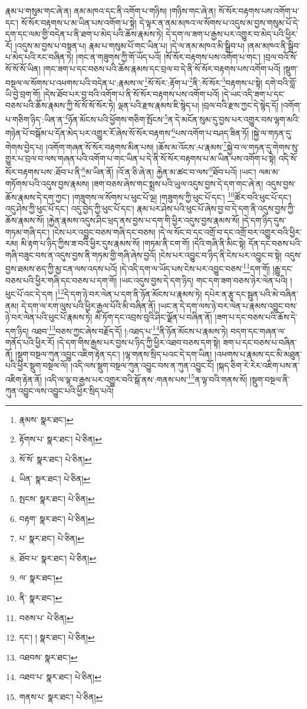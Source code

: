 རྣམ་པ་གསུམ་གང་ཞེ་ན། ནམ་མཁའ་དང་ནི་འགོག་པ་གཉིས། །གཉིས་གང་ཞེ་ན། སོ་སོར་བརྟགས་པས་འགོག་པ་དང་། སོ་སོར་བརྟགས་པ་མ་ཡིན་པས་འགོག་པ་སྟེ། དེ་ལྟར་ན་ནམ་མཁའ་ལ་སོགས་པ་འདུས་མ་བྱས་གསུམ་པོ་དེ་དག་དང་ལམ་གྱི་བདེན་པ་ནི་ཐག་པ་མེད་པའི་ཆོས་རྣམས་ཏེ། དེ་དག་ལ་ཟག་པ་རྒྱས་པར་འགྱུར་བ་མེད་པའི་ཕྱིར་རོ། །འདུས་མ་བྱས་པ་བསྟན་པ། རྣམ་པ་གསུམ་པོ་གང་ཡིན་པ། །དེ་ལ་ནམ་མཁའ་མི་སྒྲིབ་པ། །ནམ་མཁའ་ནི་སྒྲིབ་པ་མེད་པའི་རང་བཞིན་ཏེ། །གང་ན་གཟུགས་ཀྱི་གོ་ཡོད་པའོ། །སོ་སོར་བརྟགས་པས་འགོག་པ་གང་། །བྲལ་བའོ་སོ་སོ་སོ་སོ་ཡིན། །གང་ཟག་པ་དང་བཅས་པའི་ཆོས་རྣམས་དང་བྲལ་བ་དེ་ནི་སོ་སོར་བརྟགས་པས་འགོག་པའོ། །སྡུག་བསྔལ་ལ་སོགས་པ་འཕགས་པའི་བདེན་པ་:རྣམས་ལ་\footnote{རྣམས་  སྣར་ཐང་། }སོ་སོར་:རྟོག་པ་\footnote{རྟོགས་པ་  སྣར་ཐང་།  པེ་ཅིན། }ནི་:སོ་སོར་\footnote{སོ་སོ་  སྣར་ཐང་།  པེ་ཅིན། }བརྟགས་པ་སྟེ། དགེ་བའི་བློ་ཡི་བྱེ་བྲག་གོ། །དེས་ཐོབ་པར་བྱ་བའི་འགོག་པ་ནི་སོ་སོར་བརྟགས་པས་འགོག་པའོ། །དེ་ཡང་འདི་ཟག་པ་དང་བཅས་པའི་ཆོས་རྣམས་ཀྱི་སོ་སོ་སོ་སོར་ཏེ། ལྡན་པའི་རྫས་རྣམས་ཇི་སྙེད་པ། །བྲལ་བའི་རྫས་ཀྱང་དེ་སྙེད་དོ། །འགོག་པ་གཅིག་ཉིད་:ཡིན་ན་\footnote{ཡིན་  སྣར་ཐང་།  པེ་ཅིན། }ཉོན་མོངས་པའི་ཕྱོགས་གཅིག་སྤོངས་\footnote{སྤངས་  སྣར་ཐང་།  པེ་ཅིན། }ན་དེ་མངོན་སུམ་དུ་བྱས་པར་འགྱུར་བས་ལྷག་མའི་གཉེན་པོ་བསྒོམ་པ་དོན་མེད་པར་འགྱུར་རོ་ཞེས་སོ་སོར་བརྟགས་\footnote{བརྟག་  སྣར་ཐང་།  པེ་ཅིན། }པས་འགོག་པ་བཤད་ཟིན་ཏོ། །སྐྱེ་ལ་གཏན་དུ་གེགས་བྱེད་པ། །འགོག་གཞན་སོ་སོར་བརྟགས་མིན་པས། །ཆོས་མ་འོངས་:པ་རྣམས་\footnote{པ་  སྣར་ཐང་།  པེ་ཅིན། }སྐྱེ་བ་ལ་གཏན་དུ་གེགས་སུ་གྱུར་པ་བྲལ་བ་ལས་གཞན་པའི་འགོག་པ་གང་ཡིན་པ་དེ་ནི་སོ་སོར་བརྟགས་པ་མ་ཡིན་པས་འགོག་པ་སྟེ། འདི་སོ་སོར་བརྟགས་པས་:ཐོབ་པ་ནི་\footnote{ཐོབ་པ་  སྣར་ཐང་།  པེ་ཅིན། }མ་ཡིན་ནོ། །འོ་ན་ཅི་ཞེ་ན། རྐྱེན་མ་ཚང་བ་ལས་\footnote{ལ་  སྣར་ཐང་། }ཐོབ་པའོ། །ཡང་། ལམ་མ་གཏོགས་པའི་འདུས་བྱས་རྣམས། །ཟག་བཅས་ཞེས་གང་སྨྲས་པའི་ཡུལ་འདུས་བྱས་དེ་དག་གང་ཞེ་ན། འདུས་བྱས་ཆོས་རྣམས་དེ་དག་ཀྱང་། །གཟུགས་ལ་སོགས་པ་ཕུང་པོ་ལྔ། །གཟུགས་ཀྱི་ཕུང་པོ་དང་། \footnote{ནི་  སྣར་ཐང་། }ཚོར་བའི་ཕུང་པོ་དང་། འདུ་ཤེས་ཀྱི་ཕུང་པོ་དང་། འདུ་བྱེད་ཀྱི་ཕུང་པོ་དང་། རྣམ་པར་ཤེས་པའི་ཕུང་པོ་ཞེས་བྱ་བ་དེ་དག་ནི་འདུས་བྱས་ཀྱི་ཆོས་རྣམས་སོ། །རྐྱེན་རྣམས་འདུས་ཤིང་ཕྲད་ནས་བྱས་པ་དག་གི་ཕྱིར་འདུས་བྱས་རྣམས་སོ། །དེ་དག་ཉིད་དུས་གཏམ་གཞི་དང་། །ངེས་པར་འབྱུང་བཅས་གཞི་དང་བཅས། །དེ་ལ་སོང་བ་དང་འགྲོ་བ་དང་འགྲོ་བར་འགྱུར་བའི་ཕྱིར་རམ། མི་རྟག་པ་ཉིད་ཀྱིས་ཟ་བའི་ཕྱིར་དུས་རྣམས་སོ། །གཏམ་ནི་ངག་གོ། །དེའི་གཞི་ནི་མིང་སྟེ། དོན་དང་བཅས་པའི་གཞི་བཟུང་བས་ན་འདུས་བྱས་ནི་གཏམ་གྱི་གཞི་ཞེས་བྱའོ། །ངེས་པར་འབྱུང་བ་ཉིད་ནི་ངེས་པར་འབྱུང་བ་སྟེ། འདུས་བྱས་ཐམས་ཅད་ཀྱི་མྱ་ངན་ལས་འདས་པའོ། །དེ་འདི་དག་ལ་ཡོད་པས་ངེས་པར་འབྱུང་བཅས་\footnote{བཅས་པ་  པེ་ཅིན། }དག་གོ། །རྒྱུ་དང་བཅས་པའི་ཕྱིར་གཞི་དང་བཅས་པ་དག་གོ། །ཡང་འདུས་བྱས་དེ་དག་ཉིད། གང་དག་ཟག་བཅས་ཉེར་ལེན་པའི། །ཕུང་པོ་འང་དེ་དག །\footnote{དང་། །  སྣར་ཐང་།  པེ་ཅིན། }དེ་དག་ཉེ་བར་ལེན་པ་དག་ནི་ཉོན་མོངས་པ་རྣམས་ཏེ། དཔེར་ན་རྩྭ་དང་སྦུན་པའི་མེ་བཞིན་ནམ། དེ་དག་ལ་རག་ལུས་པའི་ཕྱིར་རྒྱལ་པོའི་མི་བཞིན་ནོ། །ཡང་ན་དེ་དག་ལས་ཉེ་བར་ལེན་པ་རྣམས་འབྱུང་བས་ཉེ་བར་ལེན་པའི་ཕུང་པོ་རྣམས་ཏེ། མེ་ཏོག་དང་འབྲས་བུའི་ཤིང་ལྗོན་པ་བཞིན་ནོ། །ཟག་པ་དང་བཅས་པའི་ཆོས་དེ་དག་ཉིད། འཐབ་\footnote{འཐབས་  སྣར་ཐང་། }བཅས་ཀྱང་ཞེས་བརྗོད་དོ། །:འཐད་པ་\footnote{འཐབ་པ་  སྣར་ཐང་།  པེ་ཅིན། }ནི་ཉོན་མོངས་པ་རྣམས་ཏེ། བདག་དང་གཞན་ལ་གནོད་པའི་ཕྱིར་རོ། །དེ་དག་གིས་རྒྱས་པར་བྱས་པ་ཉིད་ཀྱི་ཕྱིར་འཐབ་བཅས་དག་སྟེ། ཟག་པ་དང་བཅས་པ་བཞིན་ནོ། །སྡུག་བསྔལ་ཀུན་འབྱུང་འཇིག་རྟེན་དང་། །ལྷ་གནས་སྲིད་པའང་དེ་དག་ཡིན། །འཕགས་པ་རྣམས་དང་མི་མཐུན་པའི་ཕྱིར་སྡུག་བསྔལ་ལོ། །འདི་ལས་སྡུག་བསྔལ་ཀུན་འབྱུང་བས་ན་ཀུན་འབྱུང་ངོ། །སྐད་ཅིག་རེ་རེར་འཇིག་པས་ན་འཇིག་རྟེན་ནོ། །འདི་ལ་ལྟ་བ་རྒྱས་པར་འགྱུར་བའི་སྒོ་ནས་:གནས་པས་\footnote{གནས་པ་  སྣར་ཐང་།  པེ་ཅིན། }ན་ལྟ་བའི་གནས་སོ། །སྡུག་བསྔལ་ནི་ཀུན་འབྱུང་ལས་འབྱུང་པའི་ཕྱིར་སྲིད་པའོ། 